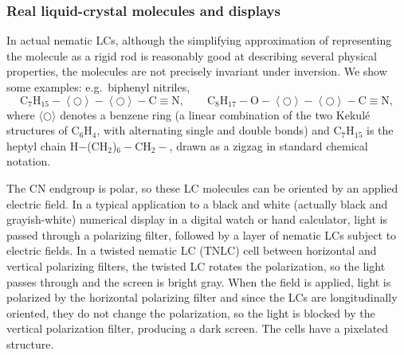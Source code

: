 \subsubsection*{Real liquid-crystal molecules and displays}

In actual nematic LCs, although the simplifying approximation of representing the molecule as a rigid rod is reasonably
good at describing several physical properties, the molecules are not precisely invariant under inversion. We show some
examples: e.g.\ biphenyl nitriles,
\begin{equation*}
  \mathrm{C_7H_{15}}\!-\!\left\langle\bigcirc\right\rangle\!-\!\left\langle\bigcirc\right\rangle\!-\!\mathrm{C{\equiv}N},
  \qquad
  \mathrm{C_8H_{17}}\!-\!\mathrm{O}\!-\!\left\langle\bigcirc\right\rangle\!-\!\left\langle\bigcirc\right\rangle\!-\!\mathrm{C{\equiv}N},
\end{equation*}
where $\langle\bigcirc\rangle$ denotes a benzene ring (a linear combination of the two Kekul\'e structures of
C$_6$H$_4$, with alternating single and double bonds) and C$_7$H$_{15}$ is the heptyl chain
H$-$(CH$_2$)$_6-$CH$_2-$, drawn as a zigzag in standard chemical notation.

The CN endgroup is polar, so these LC molecules can be oriented by an applied electric field. In a typical application to
a black and white (actually black and grayish-white) numerical display in a digital watch or hand calculator, light is
passed through a polarizing filter, followed by a layer of nematic LCs subject to electric fields. In a twisted nematic
LC (TNLC) cell between horizontal and vertical polarizing filters, the twisted LC rotates the polarization, so the light
passes through and the screen is bright gray. When the field is applied, light is polarized by the horizontal polarizing
filter and since the LCs are longitudinally oriented, they do not change the polarization, so the light is blocked by the
vertical polarization filter, producing a dark screen. The cells have a pixelated structure.

